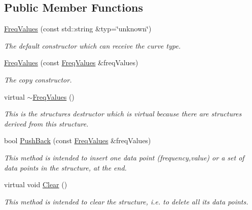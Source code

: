 \subsection*{Public Member Functions}
\begin{DoxyCompactItemize}
\item 
\hyperlink{structFreqValues_ab2ff89efb4571a8f6748017c6191d81e}{Freq\+Values} (const std\+::string \&typ=\char`\"{}unknown\char`\"{})
\begin{DoxyCompactList}\small\item\em The default constructor which can receive the curve type. \end{DoxyCompactList}\item 
\hyperlink{structFreqValues_a7061709cf9faa8e7ee6cf2d15fd30a66}{Freq\+Values} (const \hyperlink{structFreqValues}{Freq\+Values} \&freq\+Values)
\begin{DoxyCompactList}\small\item\em The copy constructor. \end{DoxyCompactList}\item 
\mbox{\label{structFreqValues_a6ec6ba96834034b3b91d1519b90027b7}} 
virtual \hyperlink{structFreqValues_a6ec6ba96834034b3b91d1519b90027b7}{$\sim$\+Freq\+Values} ()
\begin{DoxyCompactList}\small\item\em This is the structure\textquotesingle{}s destructor which is virtual because there are structures derived from this structure. \end{DoxyCompactList}\item 
bool \hyperlink{structFreqValues_a01315cf6bb4ed4e21ee1b6441c44a850}{Push\+Back} (const \hyperlink{structFreqValues}{Freq\+Values} \&freq\+Values)
\begin{DoxyCompactList}\small\item\em This method is intended to insert one data point (frequency,value) or a set of data points in the structure, at the end. \end{DoxyCompactList}\item 
\mbox{\label{structFreqValues_ad47dd37005ced2182e9be2a1e16cd702}} 
virtual void \hyperlink{structFreqValues_ad47dd37005ced2182e9be2a1e16cd702}{Clear} ()
\begin{DoxyCompactList}\small\item\em This method is intended to clear the structure, i.\+e. to delete all its data points. \end{DoxyCompactList}\item 

\end{DoxyCompactItemize}
